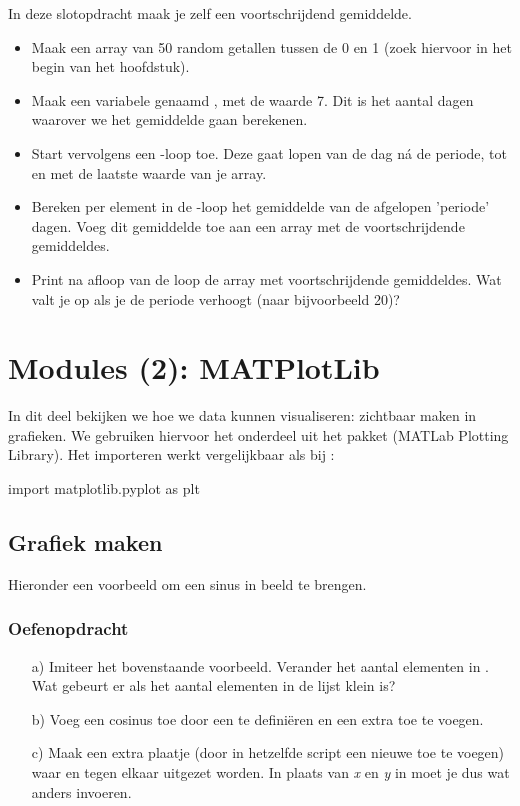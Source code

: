 \documentclass[a4paper,11pt, fleqn]{article}
\newcommand{\ditwc}{Naam van het huidige werkcollege}
\begin{document}
In deze slotopdracht maak je zelf een voortschrijdend gemiddelde.

\begin{itemize}
	\item Maak een array van 50 random getallen tussen de 0 en 1 (zoek hiervoor in het begin van het hoofdstuk).
	\item Maak een variabele genaamd , met de waarde 7. Dit is het aantal dagen waarover we het gemiddelde gaan berekenen.
	\item Start vervolgens een -loop toe. Deze gaat lopen van de dag n\'a de periode, tot en met de laatste waarde van je array.
	\item Bereken per element in de -loop het gemiddelde van de afgelopen 'periode' dagen. Voeg dit gemiddelde toe aan een array met de voortschrijdende gemiddeldes.
	\item Print na afloop van de loop de array met voortschrijdende gemiddeldes. Wat valt je op als je de periode verhoogt (naar bijvoorbeeld 20)?
\end{itemize}

\clearpage
\renewcommand{\ditwc}{Modules(2): MATPlotLib}
\section{Modules (2): MATPlotLib}
In dit deel bekijken we hoe we data kunnen visualiseren: zichtbaar maken in grafieken. We gebruiken hiervoor het  onderdeel uit het pakket  (MATLab Plotting Library). Het importeren werkt vergelijkbaar als bij :
\begin{python}
import matplotlib.pyplot as plt
\end{python}

\subsection{Grafiek maken}
Hieronder een voorbeeld om een sinus in beeld te brengen.

\subsubsection*{Oefenopdracht}
\begin{itemize}
	\item[a)] Imiteer het bovenstaande voorbeeld. Verander het aantal elementen in . Wat gebeurt er als het aantal elementen in de lijst klein is? 

	\item[b)] Voeg een cosinus toe door een  te defini\"eren en een extra  toe te voegen. 

	\item[c)] Maak een extra plaatje (door in hetzelfde script een nieuwe  toe te voegen) waar  en  tegen elkaar uitgezet worden. In plaats van \textit{x} en \textit{y} in  moet je dus wat anders invoeren.
\end{itemize}
\end{document}
